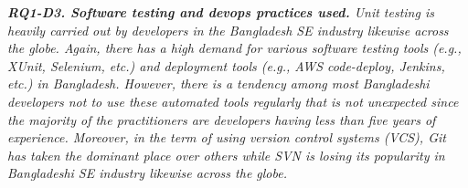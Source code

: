 \begin{tcolorbox}[flushleft upper,boxrule=1pt,arc=0pt,left=0pt,right=0pt,top=0pt,bottom=0pt,colback=white,after=\ignorespacesafterend\par\noindent]
\nd\it{\bf{RQ1-D3. Software testing and devops practices used.}} Unit testing is heavily carried out by developers in the Bangladesh SE industry likewise across the globe. Again, there has a high demand for various software testing tools (e.g., XUnit, Selenium, etc.) and deployment tools (e.g., AWS code-deploy, Jenkins, etc.) in Bangladesh. However, there is a tendency among most Bangladeshi developers not to use these automated tools regularly that is not unexpected since the majority of the practitioners are developers having less than five years of experience. Moreover, in the term of using version control systems (VCS), Git has taken the dominant place over others while SVN is losing its popularity in Bangladeshi SE industry likewise across the globe.
 
\end{tcolorbox}